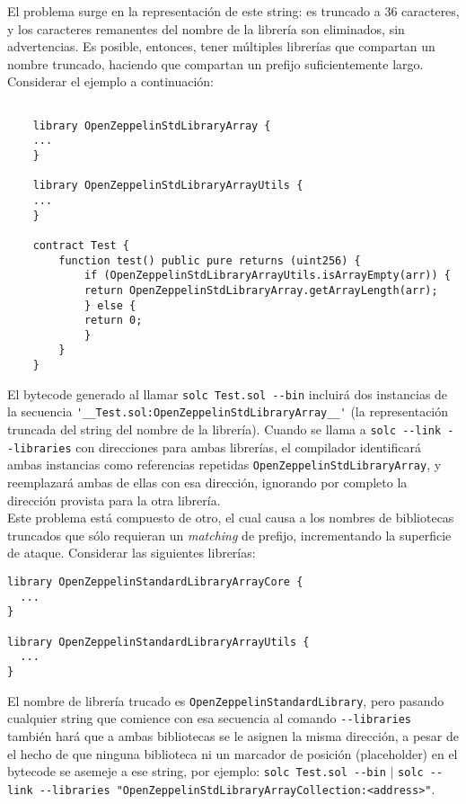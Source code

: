El problema surge en la representación de este string: es truncado a 36 caracteres, y los caracteres remanentes del nombre de la librería son eliminados, sin advertencias. Es posible, entonces, tener múltiples librerías que compartan un nombre truncado, haciendo que compartan un prefijo suficientemente largo. Considerar el ejemplo a continuación:


\begin{lstlisting}[language=Solidity]
    
    library OpenZeppelinStdLibraryArray {
    ...
    }

    library OpenZeppelinStdLibraryArrayUtils {
    ...
    }

    contract Test {
        function test() public pure returns (uint256) {
            if (OpenZeppelinStdLibraryArrayUtils.isArrayEmpty(arr)) {
            return OpenZeppelinStdLibraryArray.getArrayLength(arr);
            } else {
            return 0;
            }   
        }
    }
\end{lstlisting}

El bytecode generado al llamar \verb|solc Test.sol --bin| incluirá dos instancias de la secuencia \verb|'__Test.sol:OpenZeppelinStdLibraryArray__'| (la representación truncada del string del nombre de la librería). Cuando se llama a \verb|solc --link --libraries| con direcciones para ambas librerías, el compilador identificará ambas instancias como referencias repetidas \verb|OpenZeppelinStdLibraryArray|, y reemplazará ambas de ellas con esa dirección, ignorando por completo la dirección provista para la otra librería.\\

Este problema está compuesto de otro, el cual causa a los nombres de bibliotecas truncados que sólo requieran un \textit{matching} de prefijo, incrementando la superficie de ataque. Considerar las siguientes librerías:

\begin{lstlisting}[language=Solidity]
library OpenZeppelinStandardLibraryArrayCore {
  ...
}

library OpenZeppelinStandardLibraryArrayUtils {
  ...
}
\end{lstlisting}

El nombre de librería trucado es \verb|OpenZeppelinStandardLibrary|, pero pasando cualquier string que comience con esa secuencia al comando \verb|--libraries| también hará que a ambas bibliotecas se le asignen la misma dirección, a pesar de el hecho de que ninguna biblioteca ni un marcador de posición (placeholder) en el bytecode se asemeje a ese string, por ejemplo: \verb|solc Test.sol --bin| $\vert$ \verb|solc --link --libraries "OpenZeppelinStdLibraryArrayCollection:<address>"|.\\

